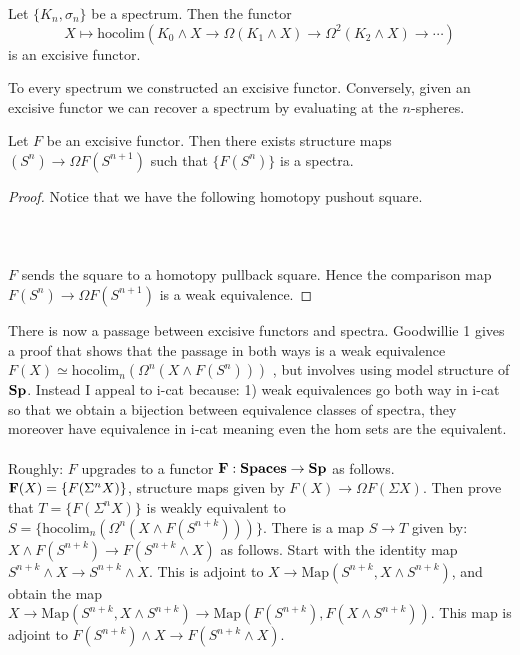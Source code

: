 \documentclass[a4paper]{article}
\begin{document}
\begin{prp}{}{} Let $\{K_n,\sigma_n\}$ be a spectrum. Then the functor $$X\mapsto\text{hocolim}(K_0\wedge X\rightarrow\Omega(K_1\wedge X)\rightarrow\Omega^2(K_2\wedge X)\rightarrow\cdots)$$ is an excisive functor. 
\end{prp}

To every spectrum we constructed an excisive functor. Conversely, given an excisive functor we can recover a spectrum by evaluating at the $n$-spheres. 

\begin{prp}{}{} Let $F$ be an excisive functor. Then there exists structure maps $(S^n)\to \Omega F(S^{n+1})$ such that $\{F(S^n)\}$ is a spectra. \tcbline
\begin{proof}
Notice that we have the following homotopy pushout square. \\~\\
\\~\\
$F$ sends the square to a homotopy pullback square. Hence the comparison map $F(S^n)\to\Omega F(S^{n+1})$ is a weak equivalence. 
\end{proof}
\end{prp}

There is now a passage between excisive functors and spectra. Goodwillie 1 gives a proof that shows that the passage in both ways is a weak equivalence $F(X)\simeq\text{hocolim}_n(\Omega^n(X\wedge F(S^n)))$ , but involves using model structure of $\bold{Sp}$. Instead I appeal to i-cat because: 1) weak equivalences go both way in i-cat so that we obtain a bijection between equivalence classes of spectra, they moreover have equivalence in i-cat meaning even the hom sets are the equivalent. \\~\\

Roughly: $F$ upgrades to a functor $\bold{F}:\bold{Spaces}\to\bold{Sp}$ as follows. $\bold{F}(X)=\{F(\Sigma^nX)\}$, structure maps given by $F(X)\to\Omega F(\Sigma X)$. Then prove that $T=\{F(\Sigma^nX)\}$ is weakly equivalent to $S=\{\text{hocolim}_n(\Omega^n(X\wedge F(S^{n+k})))\}$. There is a map $S\to T$ given by: $X\wedge F(S^{n+k})\to F(S^{n+k}\wedge X)$ as follows. Start with the identity map $S^{n+k}\wedge X\to S^{n+k}\wedge X$. This is adjoint to $X\to\text{Map}(S^{n+k},X\wedge S^{n+k})$, and obtain the map $X\to\text{Map}(S^{n+k},X\wedge S^{n+k})\to\text{Map}(F(S^{n+k}),F(X\wedge S^{n+k}))$. This map is adjoint to $F(S^{n+k})\wedge X\to F(S^{n+k}\wedge X)$. 
\end{document}
